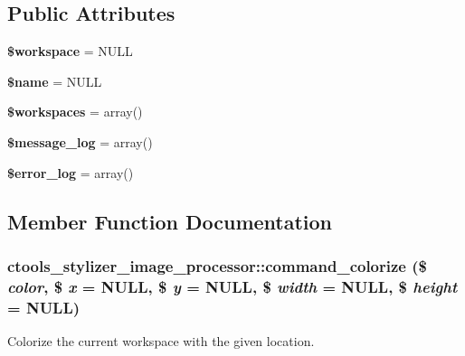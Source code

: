 \subsection*{Public Attributes}
\begin{DoxyCompactItemize}
\item 
\hypertarget{classctools__stylizer__image__processor_a80e11be8c1dca167de8045b2e5ac647b}{
{\bfseries \$workspace} = NULL}
\label{classctools__stylizer__image__processor_a80e11be8c1dca167de8045b2e5ac647b}

\item 
\hypertarget{classctools__stylizer__image__processor_a9ce82a9631fb3e460b0720ccb5564c50}{
{\bfseries \$name} = NULL}
\label{classctools__stylizer__image__processor_a9ce82a9631fb3e460b0720ccb5564c50}

\item 
\hypertarget{classctools__stylizer__image__processor_a1a30d07f00de763684d326387b959aa9}{
{\bfseries \$workspaces} = array()}
\label{classctools__stylizer__image__processor_a1a30d07f00de763684d326387b959aa9}

\item 
\hypertarget{classctools__stylizer__image__processor_afd08a2dc35197c63baebb660ea888a9a}{
{\bfseries \$message\_\-log} = array()}
\label{classctools__stylizer__image__processor_afd08a2dc35197c63baebb660ea888a9a}

\item 
\hypertarget{classctools__stylizer__image__processor_a8093c71f91a1ac14066546afdb75ebe1}{
{\bfseries \$error\_\-log} = array()}
\label{classctools__stylizer__image__processor_a8093c71f91a1ac14066546afdb75ebe1}

\end{DoxyCompactItemize}


\subsection{Member Function Documentation}
\hypertarget{classctools__stylizer__image__processor_a1bb5df184af0c953ce5d12567ec4282f}{
\subsubsection[{command\_\-colorize}]{\setlength{\rightskip}{0pt plus 5cm}ctools\_\-stylizer\_\-image\_\-processor::command\_\-colorize (\$ {\em color}, \/  \$ {\em x} = {\ttfamily NULL}, \/  \$ {\em y} = {\ttfamily NULL}, \/  \$ {\em width} = {\ttfamily NULL}, \/  \$ {\em height} = {\ttfamily NULL})}}
\label{classctools__stylizer__image__processor_a1bb5df184af0c953ce5d12567ec4282f}
Colorize the current workspace with the given location.

